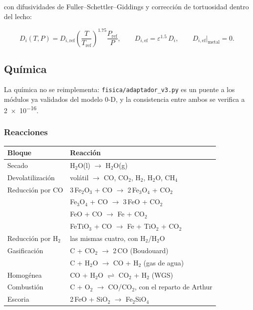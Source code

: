 con difusividades de Fuller--Schettler--Giddings y corrección de tortuosidad
dentro del lecho:

\begin{equation}
D_i(T,P) = D_{i,\mathrm{ref}}\left(\frac{T}{T_{\mathrm{ref}}}\right)^{1.75}
\frac{P_{\mathrm{ref}}}{P},
\qquad
D_{i,\mathrm{ef}} = \varepsilon^{1.5}\, D_i ,
\qquad
D_{i,\mathrm{ef}}\big|_{\text{metal}} = 0 .
\end{equation}

\subsection{Química}

La química no se reimplementa: \texttt{fisica/adaptador\_v3.py} es un puente a
los módulos ya validados del modelo 0-D, y la consistencia entre ambos se
verifica a \num{2e-16}.

\subsubsection{Reacciones}

\begin{table}[H]
\centering\small
\begin{tabular}{ll}
\toprule
\textbf{Bloque} & \textbf{Reacción} \\
\midrule
Secado & H$_2$O(l) $\rightarrow$ H$_2$O(g) \\
Devolatilización & volátil $\rightarrow$ CO, CO$_2$, H$_2$, H$_2$O, CH$_4$ \\
Reducción por CO & 3\,Fe$_2$O$_3$ + CO $\rightarrow$ 2\,Fe$_3$O$_4$ + CO$_2$ \\
 & Fe$_3$O$_4$ + CO $\rightarrow$ 3\,FeO + CO$_2$ \\
 & FeO + CO $\rightarrow$ Fe + CO$_2$ \\
 & FeTiO$_3$ + CO $\rightarrow$ Fe + TiO$_2$ + CO$_2$ \\
Reducción por H$_2$ & las mismas cuatro, con H$_2$/H$_2$O \\
Gasificación & C + CO$_2$ $\rightarrow$ 2\,CO \quad (Boudouard) \\
 & C + H$_2$O $\rightarrow$ CO + H$_2$ \quad (gas de agua) \\
Homogénea & CO + H$_2$O $\rightleftharpoons$ CO$_2$ + H$_2$ \quad (WGS) \\
Combustión & C + O$_2$ $\rightarrow$ CO/CO$_2$, con el reparto de Arthur \\
Escoria & 2\,FeO + SiO$_2$ $\rightarrow$ Fe$_2$SiO$_4$ \\
\bottomrule
\end{tabular}
\end{table}

